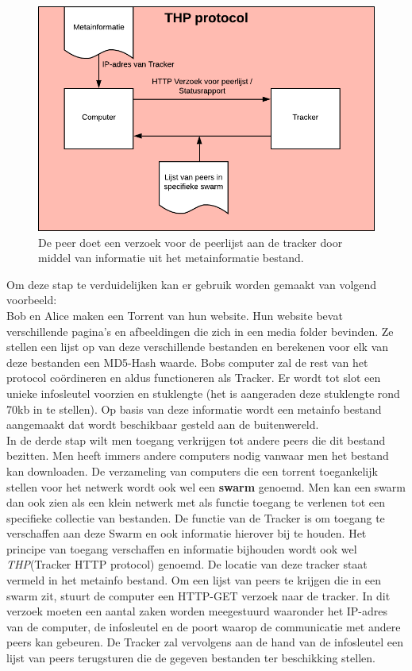 \begin{figure}[h!]
	\centering
		\includegraphics[scale=.4]{torrent-2.png}
			\caption[THP stap - Torrenting 2]{De peer doet een verzoek voor de peerlijst aan de tracker door middel van informatie uit het metainformatie bestand.}
\end{figure}
\newpage
Om deze stap te verduidelijken kan er gebruik worden gemaakt van volgend voorbeeld:\\

Bob en Alice maken een Torrent van hun website. Hun website bevat verschillende pagina's en afbeeldingen die zich in een media folder bevinden. Ze stellen een lijst op van deze verschillende bestanden en berekenen voor elk van deze bestanden een MD5-Hash waarde. Bobs computer zal de rest van het protocol coördineren en aldus functioneren als Tracker. Er wordt tot slot een unieke infosleutel voorzien en stuklengte (het is aangeraden deze stuklengte rond 70kb in te stellen). Op basis van deze informatie wordt een metainfo bestand aangemaakt dat wordt beschikbaar gesteld aan de buitenwereld.\\

In de derde stap wilt men toegang verkrijgen tot andere peers die dit bestand bezitten. Men heeft immers andere computers nodig vanwaar men het bestand kan downloaden. De verzameling van computers die een torrent toegankelijk stellen voor het netwerk wordt ook wel een \textbf{swarm} genoemd. Men kan een swarm dan ook zien als een klein netwerk met als functie toegang te verlenen tot een specifieke collectie van bestanden. De functie van de Tracker is om toegang te verschaffen aan deze Swarm en ook informatie hierover bij te houden. Het principe van toegang verschaffen en informatie bijhouden wordt ook wel \textit{THP}(Tracker HTTP protocol) genoemd. De locatie van deze tracker staat vermeld in het metainfo bestand. Om een lijst van peers te krijgen die in een swarm zit, stuurt de computer een HTTP-GET verzoek naar de tracker. In dit verzoek moeten een aantal zaken worden meegestuurd waaronder het IP-adres van de computer, de infosleutel en de poort waarop de communicatie met andere peers kan gebeuren. De Tracker zal vervolgens aan de hand van de infosleutel een lijst van peers terugsturen die de gegeven bestanden ter beschikking stellen.\\

